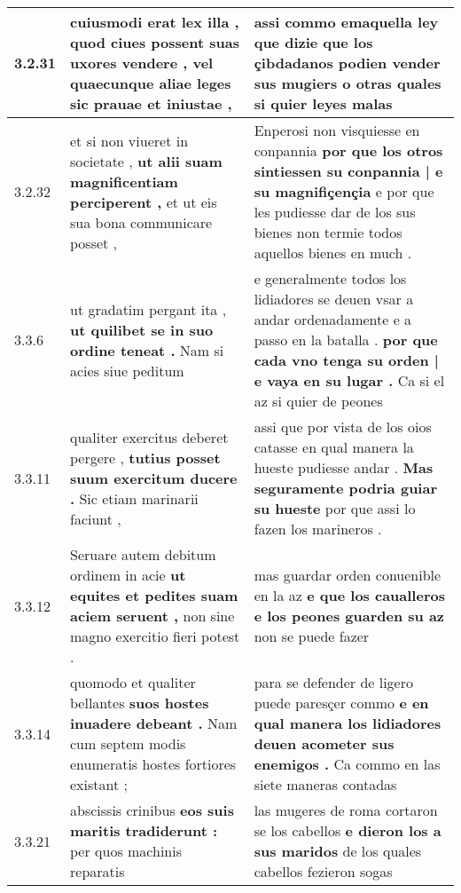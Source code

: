 \begin{tabular}{|p{1cm}|p{6.5cm}|p{6.5cm}|}
3.2.31 & cuiusmodi erat lex illa , \textbf{ quod ciues possent suas uxores vendere , } vel quaecunque aliae leges sic prauae et iniustae , & assi commo emaquella ley que dizie \textbf{ que los çibdadanos podien vender sus mugiers } o otras quales si quier leyes malas \\\hline
3.2.32 & et si non viueret in societate , \textbf{ ut alii suam magnificentiam perciperent , } et ut eis sua bona communicare posset , & Enperosi non visquiesse en conpannia \textbf{ por que los otros sintiessen su conpannia | e su magnifiçençia } e por que les pudiesse dar de los sus bienes non termie todos aquellos bienes en much . \\\hline
3.3.6 & ut gradatim pergant ita , \textbf{ ut quilibet se in suo ordine teneat . } Nam si acies siue peditum & e generalmente todos los lidiadores se deuen vsar a andar ordenadamente e a passo en la batalla . \textbf{ por que cada vno tenga su orden | e vaya en su lugar . } Ca si el az si quier de peones \\\hline
3.3.11 & qualiter exercitus deberet pergere , \textbf{ tutius posset suum exercitum ducere . } Sic etiam marinarii faciunt , & assi que por vista de los oios catasse en qual manera la hueste pudiesse andar . \textbf{ Mas seguramente podria guiar su hueste } por que assi lo fazen los marineros . \\\hline
3.3.12 & Seruare autem debitum ordinem in acie \textbf{ ut equites et pedites suam aciem seruent , } non sine magno exercitio fieri potest . & mas guardar orden conuenible en la az \textbf{ e que los caualleros e los peones guarden su az } non se puede fazer \\\hline
3.3.14 & quomodo et qualiter bellantes \textbf{ suos hostes inuadere debeant . } Nam cum septem modis enumeratis hostes fortiores existant ; & para se defender de ligero puede paresçer commo \textbf{ e en qual manera los lidiadores deuen acometer sus enemigos . } Ca commo en las siete maneras contadas \\\hline
3.3.21 & abscissis crinibus \textbf{ eos suis maritis tradiderunt : } per quos machinis reparatis & las mugeres de roma cortaron se los cabellos \textbf{ e dieron los a sus maridos } de los quales cabellos fezieron sogas \\\hline

\end{tabular}
